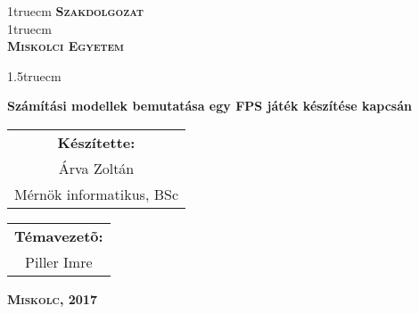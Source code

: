 \pagestyle{empty} %

{\large
\begin{center}
\vglue 1truecm
\textbf{\huge\textsc{Szakdolgozat}}\\
\vglue 1truecm
\\
\textbf{\textsc{Miskolci Egyetem}}
\end{center}}

\vglue 1.5truecm %

{\LARGE
\begin{center}
\textbf{Számítási modellek bemutatása egy FPS játék készítése kapcsán}
\end{center}}

\vspace*{2.5truecm}
{\large
\begin{center}
\begin{tabular}{c}
\textbf{Készítette:}\\
Árva Zoltán\\
Mérnök informatikus, BSc
\end{tabular}
\end{center}
\begin{center}
\begin{tabular}{c}
\textbf{Témavezetõ:}\\
Piller Imre
\end{tabular}
\end{center}}
\vfill
{\large
\begin{center}
\textbf{\textsc{Miskolc, 2017}}
\end{center}}

\newpage
